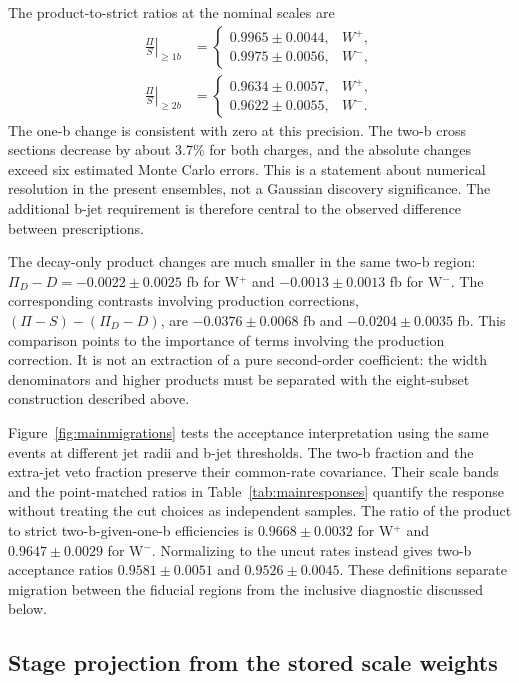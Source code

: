 The product-to-strict ratios at the nominal scales are
\begin{align}
 \left.\frac{\Pi}{S}\right|_{\geq1b}
 &=\begin{cases}
 0.9965\pm0.0044,& W^+,\\
 0.9975\pm0.0056,& W^-,
 \end{cases}\\
 \left.\frac{\Pi}{S}\right|_{\geq2b}
 &=\begin{cases}
 0.9634\pm0.0057,& W^+,\\
 0.9622\pm0.0055,& W^-.
 \end{cases}
\end{align}
The one-b change is consistent with zero at this precision. The two-b
cross sections decrease by about 3.7\% for both charges, and the absolute
changes exceed six estimated Monte Carlo errors. This is a statement
about numerical resolution in the present ensembles, not a Gaussian
discovery significance. The additional b-jet requirement is therefore
central to the observed difference between prescriptions.

The decay-only product changes are much smaller in the same two-b region:
$\Pi_D-D=-0.0022\pm0.0025$ fb for W$^+$ and
$-0.0013\pm0.0013$ fb for W$^-$. The corresponding contrasts involving
production corrections,
$(\Pi-S)-(\Pi_D-D)$, are $-0.0376\pm0.0068$ fb and
$-0.0204\pm0.0035$ fb. This comparison points to the importance of terms
involving the production correction. It is not an extraction of a pure
second-order coefficient: the width denominators and higher products
must be separated with the eight-subset construction described above.

Figure~\ref{fig:mainmigrations} tests the acceptance interpretation using
the same events at different jet radii and b-jet thresholds. The two-b
fraction and the extra-jet veto fraction preserve their common-rate
covariance. Their scale bands and the point-matched ratios in
Table~\ref{tab:mainresponses} quantify the response without treating the
cut choices as independent samples.
The ratio of the product to strict two-b-given-one-b efficiencies is
$0.9668\pm0.0032$ for W$^+$ and $0.9647\pm0.0029$ for W$^-$.
Normalizing to the uncut rates instead gives two-b acceptance ratios
$0.9581\pm0.0051$ and $0.9526\pm0.0045$. These definitions separate
migration between the fiducial regions from the inclusive diagnostic
discussed below.

\subsection{Stage projection from the stored scale weights}

